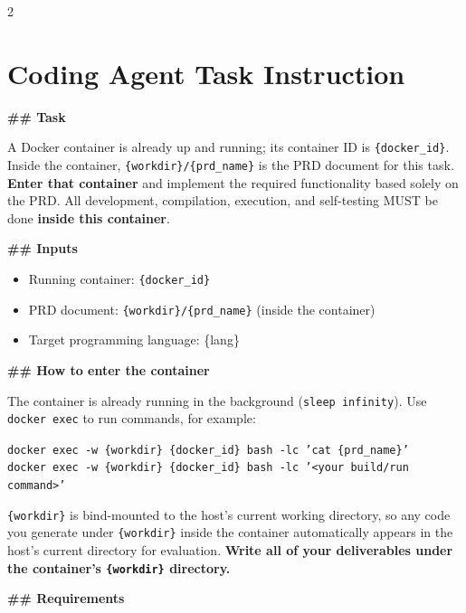\begin{multicols}{2}
\section{Coding Agent Task Instruction}
\label{appendix:agent-task}
\end{multicols}

\begin{promptbox}
\textbf{\#\# Task}

A Docker container is already up and running; its container ID is \texttt{\{docker\_id\}}. Inside the container, \texttt{\{workdir\}/\{prd\_name\}} is the PRD document for this task. \textbf{Enter that container} and implement the required functionality based solely on the PRD. All development, compilation, execution, and self-testing MUST be done \textbf{inside this container}.

\textbf{\#\# Inputs}

\begin{itemize}
\item Running container: \texttt{\{docker\_id\}}
\item PRD document: \texttt{\{workdir\}/\{prd\_name\}} (inside the container)
\item Target programming language: \{lang\}
\end{itemize}

\textbf{\#\# How to enter the container}

The container is already running in the background (\texttt{sleep infinity}). Use \texttt{docker exec} to run commands, for example:

\texttt{docker exec -w \{workdir\} \{docker\_id\} bash -lc 'cat \{prd\_name\}'}\\
\texttt{docker exec -w \{workdir\} \{docker\_id\} bash -lc '<your build/run command>'}

\texttt{\{workdir\}} is bind-mounted to the host's current working directory, so any code you generate under \texttt{\{workdir\}} inside the container automatically appears in the host's current directory for evaluation. \textbf{Write all of your deliverables under the container's \texttt{\{workdir\}} directory.}

\textbf{\#\# Requirements}


\end{promptbox}
